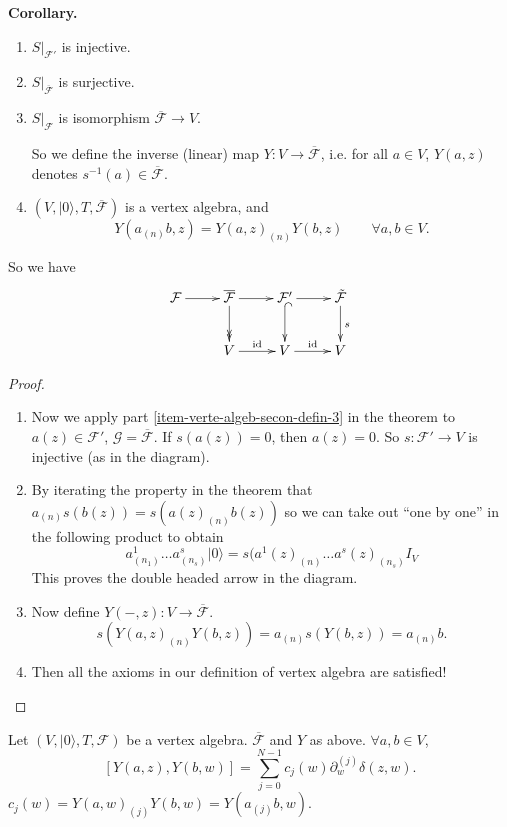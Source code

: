 \medskip\noindent
{\bf Corollary.}
\begin{enumerate}
\item $S|_{\mathcal{F}'}$ is injective.
\item $S|_{\overline{\mathcal{F}}}$ is
surjective.
\item $S|_{\mathcal{F}}$ is isomorphism
$\overline{\mathcal{F}}\to V$.

So we define the inverse (linear) map $Y:V
\to \overline{\mathcal{F}}$,
i.e. for all $a \in V$, $Y(a,z)$ denotes
$s^{-1}(a) \in \overline{\mathcal{F}}$.

\item
$(V,|0\rangle,T,\overline{\mathcal{F}})$
is a vertex algebra,
and
$$
Y(a_{(n)}b,z)=Y(a,z)_{(n)}Y(b,z)\qquad
\forall a,b \in V.
$$
\end{enumerate}

So we have
$$
\xymatrix{
\mathcal{F}\ar[r]&\overline{\mathcal{F}}
\ar@{->>}[d]\ar[r]&
\mathcal{F}'\ar@{^{(}->}[d]\ar[r]&
\tilde{\mathcal{F}}\ar[d]^s\\
&  V\ar[r]^{\text{id}}& V\ar[r]^{\text{id}}
&V
}
$$
\begin{proof}
\begin{enumerate}
\item Now we apply part
\ref{item-verte-algeb-secon-defin-3}
 in the theorem to $a(z) \in \mathcal{F}'$,
$\mathcal{G}=\overline{\mathcal{F}}$.
If $s(a(z))=0$, then  $a(z)=0$. So
$s:\mathcal{F}' \to V$ is injective
(as in the diagram).

\item By iterating the property in the
theorem that
$a_{(n)}s(b(z))=s(a(z)_{(n)}b(z))$ so we can
take out ``one by one''
in the following product to obtain
$$
a^1_{(n_1)}\ldots a_{(n_s)}^s |0\rangle
=s(a^1(z)_{(n)}\ldots a^s(z)_{(n_s)}I_V
$$
This proves the double headed arrow in the
diagram.

\item Now define $Y(-,z):V \to
\overline{\mathcal{F}}$.
$$
s(Y(a,z)_{(n)}Y(b,z))=a_{(n)}s(Y(b,z))=a_{(n)
}b.
$$
\item Then all the axioms in our definition
of vertex algebra are
satisfied!
\end{enumerate}
\end{proof}

\begin{remark}
\label{remark-a-relation}
Let $(V,|0\rangle,T,\mathcal{F})$ be a vertex
algebra.
$\overline{\mathcal{F}}$ and $Y$ as above.
$\forall a,b \in V$,
\begin{equation}
\label{equation-star2}
[Y(a,z),Y(b,w)]=\sum_{j=0}^{N-1}c_j(w)
\partial_w^{(j)}\delta(z,w).
\end{equation}
$c_j(w)=Y(a,w)_{(j)}Y(b,w)=Y(a_{(j)}b,w)$.
\end{remark}

